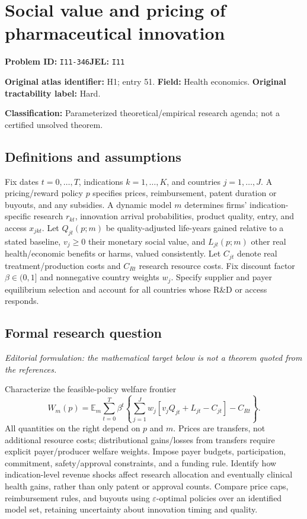 \documentclass[11pt,a4paper]{article}
\begin{document}
\section*{Social value and pricing of pharmaceutical innovation}
\textbf{Problem ID:} \texttt{I11-346}\quad \textbf{JEL:} \texttt{I11}\par
\label{problem:OP-0051}
\label{atlas:prob:H1}
\noindent\textbf{Original atlas identifier:} H1; entry 51. \textbf{Field:} Health economics. \textbf{Original tractability label:} Hard.

\noindent\textbf{Classification:} Parameterized theoretical/empirical research agenda; not a certified unsolved theorem.

\subsection*{Definitions and assumptions}
Fix dates $t=0,\ldots,T$, indications $k=1,\ldots,K$, and countries $j=1,\ldots,J$. A pricing/reward policy $p$ specifies prices, reimbursement, patent duration or buyouts, and any subsidies. A dynamic model $m$ determines firms' indication-specific research $r_{kt}$, innovation arrival probabilities, product quality, entry, and access $x_{jkt}$. Let $Q_{jt}(p;m)$ be quality-adjusted life-years gained relative to a stated baseline, $v_j\geq0$ their monetary social value, and $L_{jt}(p;m)$ other real health/economic benefits or harms, valued consistently. Let $C_{jt}$ denote real treatment/production costs and $C_{Rt}$ research resource costs. Fix discount factor $\beta\in(0,1]$ and nonnegative country weights $w_j$. Specify supplier and payer equilibrium selection and account for all countries whose R\&D or access responds.

\subsection*{Formal research question}
\emph{Editorial formulation: the mathematical target below is not a theorem quoted from the references.}

Characterize the feasible-policy welfare frontier
\[
 W_m(p)=\mathbb E_m\sum_{t=0}^{T}\beta^t\left\{
 \sum_{j=1}^{J}w_j[v_jQ_{jt}+L_{jt}-C_{jt}]-C_{Rt}\right\}.
\]
All quantities on the right depend on $p$ and $m$. Prices are transfers, not additional resource costs; distributional gains/losses from transfers require explicit payer/producer welfare weights. Impose payer budgets, participation, commitment, safety/approval constraints, and a funding rule. Identify how indication-level revenue shocks affect research allocation and eventually clinical health gains, rather than only patent or approval counts. Compare price caps, reimbursement rules, and buyouts using $\varepsilon$-optimal policies over an identified model set, retaining uncertainty about innovation timing and quality.
\end{document}
